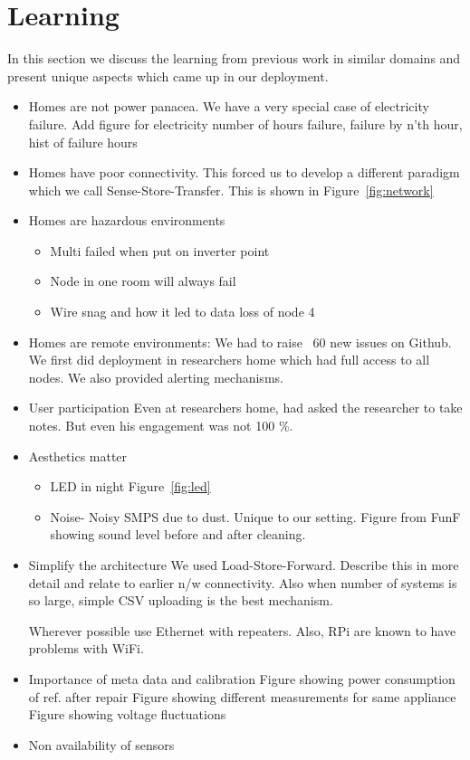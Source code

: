 \documentclass[10pt]{sensys-proc}
\newcommand{\figref}[1]{Figure~\ref{#1}}
\begin{document}
\section{Learning}
In this section we discuss the learning from previous work in similar domains and present unique aspects which came up in our deployment.
\begin{itemize}

\item Homes are not power panacea. We have a very special case of electricity failure. Add figure
for electricity number of hours failure, failure by n'th hour, hist of failure hours
\item Homes have poor connectivity. This forced us to develop a different paradigm which we call Sense-Store-Transfer. This is shown in \figref{fig:network}

\item Homes are hazardous environments
\begin{itemize}
\item Multi failed when put on inverter point
\item Node in one room will always fail
\item Wire snag and how it led to data loss of node 4
\end{itemize}

\item Homes are remote environments:
We had to raise ~60 new issues on Github. We first did deployment in researchers home which had full access to all nodes.
We also provided alerting mechanisms.

\item User participation
Even at researchers home, had asked the researcher to take notes. But even his engagement was not 100 \%.

\item Aesthetics matter
\begin{itemize}
\item LED in night \figref{fig:led}
\item Noise- Noisy SMPS due to dust. Unique to our setting. Figure from FunF showing sound level before and after cleaning.
\end{itemize}

\item Simplify the architecture
We used Load-Store-Forward. Describe this in more detail and relate to earlier n/w connectivity.
Also when number of systems is so large, simple CSV uploading is the best mechanism.

Wherever possible use Ethernet with repeaters. Also, RPi are known to have problems with WiFi.

\item Importance of meta data and calibration
Figure showing power consumption of ref. after repair
Figure showing different measurements for same appliance
Figure showing voltage fluctuations

\item Non availability of sensors

\end{itemize}
\end{document}
